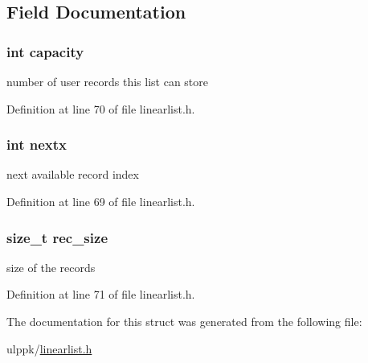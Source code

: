 \subsection{Field Documentation}
\hypertarget{struct_l_i_n_e_a_r___l_i_s_t___h_e_a_d_e_r_adbe66a087ac3fd4a5b0566f64ca2d12b}{
\subsubsection[{capacity}]{\setlength{\rightskip}{0pt plus 5cm}int capacity}}\label{struct_l_i_n_e_a_r___l_i_s_t___h_e_a_d_e_r_adbe66a087ac3fd4a5b0566f64ca2d12b}


number of user records this list can store 



Definition at line 70 of file linearlist.\-h.

\hypertarget{struct_l_i_n_e_a_r___l_i_s_t___h_e_a_d_e_r_ae2e9d7fed40752915b807c5e6d7271ad}{
\subsubsection[{nextx}]{\setlength{\rightskip}{0pt plus 5cm}int nextx}}\label{struct_l_i_n_e_a_r___l_i_s_t___h_e_a_d_e_r_ae2e9d7fed40752915b807c5e6d7271ad}


next available record index 



Definition at line 69 of file linearlist.\-h.

\hypertarget{struct_l_i_n_e_a_r___l_i_s_t___h_e_a_d_e_r_a6af15626e40c23bd7d5b67f5a54c8344}{
\subsubsection[{rec\-\_\-size}]{\setlength{\rightskip}{0pt plus 5cm}size\-\_\-t rec\-\_\-size}}\label{struct_l_i_n_e_a_r___l_i_s_t___h_e_a_d_e_r_a6af15626e40c23bd7d5b67f5a54c8344}


size of the records 



Definition at line 71 of file linearlist.\-h.



The documentation for this struct was generated from the following file\-:\begin{DoxyCompactItemize}
\item 
ulppk/\hyperlink{linearlist_8h}{linearlist.\-h}\end{DoxyCompactItemize}
